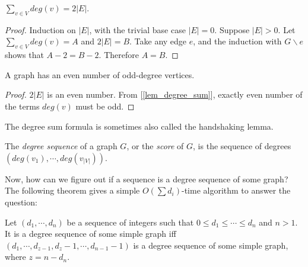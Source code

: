         \begin{lemma} \label{lem_degree_sum}
            $\sum_{v \in V}deg(v) = 2|E|$.
        \end{lemma}
        
        \begin{proof}
            Induction on $|E|$, with the trivial base case $|E| = 0$. Suppose $|E| > 0$. Let $\sum_{v \in V}deg(v) = A$ and $2|E| = B$. Take any edge $e$, and the induction with $G\backslash e$ shows that $A-2 = B-2$. Therefore $A=B$.
        \end{proof}
        
        \begin{lemma}
            A graph has an even number of odd-degree vertices.
        \end{lemma}
        
        \begin{proof}
            $2|E|$ is an even number. From [\ref{lem_degree_sum}], exactly even number of the terms $deg(v)$ must be odd.
        \end{proof}
        
        The degree sum formula is sometimes also called the handshaking lemma.
        
        \begin{defn} \label{def_graph_score}
            The \emph{degree sequence} of a graph $G$, or the \emph{score} of $G$, is the sequence of degrees $(deg(v_1),\cdots,deg(v_{|V|}))$.
        \end{defn}
        
        Now, how can we figure out if a sequence is a degree sequence of some graph? The following theorem gives a simple $O(\sum d_i)$-time algorithm to answer the question:
        
        \begin{thm} \label{thm_havel_hakimi}
            Let $(d_1,\cdots,d_n)$ be a sequence of integers such that $0 \leq d_1 \leq \cdots \leq d_n$ and $n>1$. It is a degree sequence of some simple graph iff $(d_1,\cdots,d_{z-1},d_z-1,\cdots,d_{n-1}-1)$ is a degree sequence of some simple graph, where $z = n-d_n$.
        \end{thm}
        
